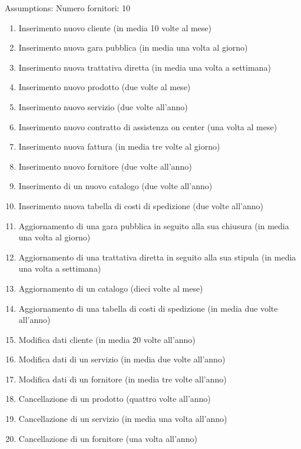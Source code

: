 

Assumptions: Numero fornitori: 10

\begin{enumerate}

  \item Inserimento nuovo cliente (in media 10 volte al mese)
  \item Inserimento nuova gara pubblica (in media una volta al giorno)
  \item Inserimento nuova trattativa diretta (in media una volta a settimana)
  \item Inserimento nuovo prodotto (due volte al mese)
  \item Inserimento nuovo servizio (due volte all'anno)
  \item Inserimento nuovo contratto di assistenza on center (una volta al mese)
  \item Inserimento nuova fattura (in media tre volte al giorno)
  \item Inserimento nuovo fornitore (due volte all'anno)
  \item Inserimento di un nuovo catalogo (due volte all'anno)
  \item Inserimento nuova tabella di costi di spedizione (due volte all'anno)
  \item Aggiornamento di una gara pubblica in seguito alla sua chiusura (in media una volta al giorno)
  \item Aggiornamento di una trattativa diretta in seguito alla sua stipula (in media una volta a settimana)
  \item Aggiornamento di un catalogo (dieci volte al mese)
  \item Aggiornamento di una tabella di costi di spedizione (in media due volte all'anno)
  \item Modifica dati cliente (in media 20 volte all'anno)
  \item Modifica dati di un servizio (in media due volte all'anno)
  \item Modifica dati di un fornitore (in media tre volte all'anno)
  \item Cancellazione di un prodotto (quattro volte all'anno)
  \item Cancellazione di un servizio (in media una volta all'anno)
  \item Cancellazione di un fornitore (una volta all'anno)

\end{enumerate}
